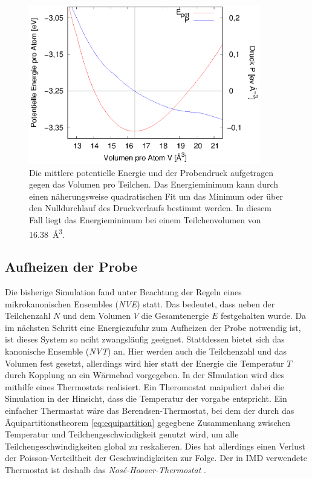 		\begin{figure}[!ht]
			\centering
			\includegraphics[width=0.9\textwidth]{chapter/main/single/plt/equilibration/homdef.eps}
			\caption{Die mittlere potentielle Energie und der Probendruck aufgetragen gegen das
			Volumen pro Teilchen. Das Energieminimum kann durch einen näherungsweise quadratischen
			Fit um das Minimum oder über den Nulldurchlauf des Druckverlaufs bestimmt werden. In
			diesem Fall liegt das Energieminimum bei einem Teilchenvolumen von
			\SI{16.38}{\angstrom\cubed}.}
			\label{fig:homdef}
		\end{figure}

	\subsection{Aufheizen der Probe}
		Die bisherige Simulation fand unter Beachtung der Regeln eines mikrokanonischen Ensembles
		(\emph{NVE}) statt. Das bedeutet, dass neben der Teilchenzahl $N$ und dem Volumen $V$ die
		Gesamtenergie $E$ festgehalten wurde. Da im nächsten Schritt eine Energiezufuhr zum
		Aufheizen der Probe notwendig ist, ist dieses System so nciht zwangsläufig geeignet.
		Stattdessen bietet sich das kanonische Ensemble (\emph{NVT}) an. Hier werden auch die
		Teilchenzahl und das Volumen fest gesetzt, allerdings wird hier statt der Energie die
		Temperatur $T$ durch Kopplung an ein Wärmebad vorgegeben. In der SImulation wird dies
		mithilfe eines Thermostats realisiert. Ein Theromostat maipuliert dabei die Simulation in
		der Hinsicht, dass die Temperatur der vorgabe entspricht. Ein einfacher Thermastat wäre
		das Berendsen-Thermostat, bei dem der durch das Äquipartitionstheorem
		\eqref{eq:equipartition} gegegbene Zusammenhang zwischen Temperatur und
		Teilchengeschwindigkeit genutzt wird, um alle Teilchengeschwindigkeiten global zu
		reskalieren. Dies hat allerdings einen Verlust der Poisson-Verteiltheit der
		Geschwindigkeiten zur Folge. Der in IMD verwendete Thermostat ist deshalb das
		\emph{Nosé-Hoover-Thermostat} \cite{rapp2014laserablation}.

